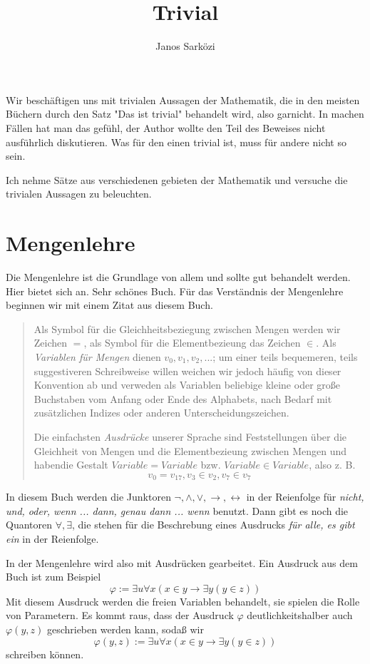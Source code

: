 \documentclass[11pt, a4paper]{article}
\title{Trivial}
\author{Janos Sarközi}
\begin{document}
\maketitle
\newpage
\tableofcontents
\newpage

Wir beschäftigen uns mit trivialen Aussagen der Mathematik, die in den meisten
Büchern durch den Satz "Das ist trivial" behandelt wird, also garnicht. In
machen Fällen hat man das gefühl, der Author wollte den Teil des Beweises
nicht ausführlich diskutieren. Was für den einen trivial ist, muss für andere
nicht so sein.

Ich nehme Sätze aus verschiedenen gebieten der Mathematik und versuche die
trivialen Aussagen zu beleuchten.

\newpage
\section{Mengenlehre} Die Mengenlehre ist die Grundlage von allem und sollte
gut behandelt werden.  Hier bietet sich \cite{Ebbinghaus2003} an. Sehr
schönes Buch. Für das Verständnis der Mengenlehre beginnen wir mit einem
Zitat aus diesem Buch.
\begin{quote}
    Als Symbol für die Gleichheitsbeziegung zwischen Mengen werden wir Zeichen
    $=$, als Symbol für die Elementbezieung das Zeichen $\in$. Als
    \textit{Variablen für Mengen} dienen $v_0, v_1, v_2, ...$; um einer teils
    bequemeren, teils suggestiveren Schreibweise willen weichen wir jedoch
    häufig von dieser Konvention ab und verweden als Variablen beliebige
    kleine oder große Buchstaben vom Anfang oder Ende des Alphabets, nach Bedarf
    mit zusätzlichen Indizes oder anderen Unterscheidungszeichen.

    Die einfachsten \textit{Ausdrücke} unserer Sprache sind Feststellungen
    über die Gleichheit von Mengen und die Elementbezieung zwischen Mengen und
    habendie Gestalt $Variable = Variable$ bzw. $Variable \in Variable$, also
    z. B.
    \[
        v_0 = v_{17}, v_3 \in v_2, v_7 \in v_7
    \]%
\end{quote}
In diesem Buch werden die Junktoren $\lnot, \land, \lor, \rightarrow,
\leftrightarrow$ in der Reienfolge für \textit{nicht, und, oder, wenn ...
dann, genau dann ... wenn} benutzt. Dann gibt es noch die Quantoren $\forall,
\exists$, die stehen für die Beschrebung eines Ausdrucks \textit{für alle, es
gibt ein} in der Reienfolge.
\newline

In der Mengenlehre wird also mit Ausdrücken gearbeitet. Ein Ausdruck aus dem
Buch ist zum Beispiel
\[
    \varphi := \exists u\forall x(x\in y \rightarrow \exists y(y\in z))
\]
Mit diesem Ausdruck werden die freien Variablen behandelt, sie spielen die
Rolle von Parametern. Es kommt raus, dass der Ausdruck $\varphi$
deutlichkeitshalber auch $\varphi(y, z)$ geschrieben werden kann, sodaß wir
\[
    \varphi(y, z) := \exists u\forall x(x\in y \rightarrow \exists y(y\in z))
\]
schreiben können.
\end{document}
